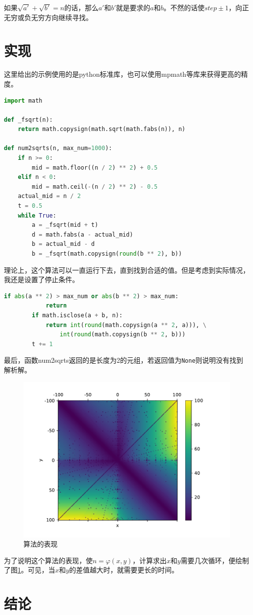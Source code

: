 \documentclass[a4paper, UTF8]{ctexart}
\begin{document}
如果$\sqrt{a'}+\sqrt{b'}=n$的话，那么$a'$和$b'$就是要求的$a$和$b$。不然的话使$step\pm1$，向正无穷或负无穷方向继续寻找。

\section{实现}
这里给出的示例使用的是python标准库，也可以使用mpmath等库来获得更高的精度。
\begin{lstlisting}[language=python, name=example]
import math

def _fsqrt(n):
    return math.copysign(math.sqrt(math.fabs(n)), n)

def num2sqrts(n, max_num=1000):
    if n >= 0:
        mid = math.floor((n / 2) ** 2) + 0.5
    elif n < 0:
        mid = math.ceil(-(n / 2) ** 2) - 0.5
    actual_mid = n / 2
    t = 0.5
    while True:
        a = _fsqrt(mid + t)
        d = math.fabs(a - actual_mid)
        b = actual_mid - d
        b = _fsqrt(math.copysign(round(b ** 2), b))
\end{lstlisting}
理论上，这个算法可以一直运行下去，直到找到合适的值。但是考虑到实际情况，我还是设置了停止条件。
\begin{lstlisting}[language=python, name=example]
        if abs(a ** 2) > max_num or abs(b ** 2) > max_num:
            return
        if math.isclose(a + b, n):
            return int(round(math.copysign(a ** 2, a))), \
                int(round(math.copysign(b ** 2, b)))
        t += 1
\end{lstlisting}
最后，函数num2sqrts返回的是长度为2的元组，若返回值为\verb|None|则说明没有找到解析解。

\begin{figure}[htb]
	\centering
	\includegraphics[width=0.8\linewidth]{perform.pdf}
	\caption{算法的表现}
	\label{fig:perform}
\end{figure}

为了说明这个算法的表现，使$n=\varphi(x,y)$，计算求出$x$和$y$需要几次循环，便绘制了图\ref{fig:perform}。可见，当$x$和$y$的差值越大时，就需要更长的时间。

\section{结论}
\end{document}
